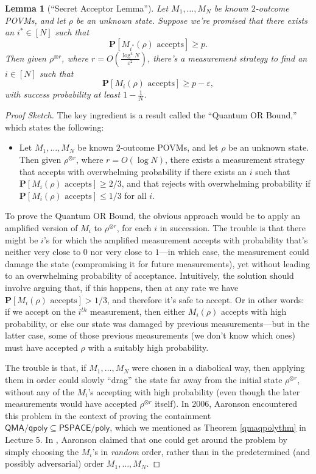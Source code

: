 \documentclass[12pt]{report}
\theoremstyle{plain}
\newtheorem{lemma}[theorem]{Lemma}
\theoremstyle{definition}
\newcommand{\eps}{\varepsilon}
\renewcommand{\Pr}{\mathbf{P}}
\begin{document}
\begin{lemma}[``Secret Acceptor Lemma'']
\label{secretacc}
Let $M_1,\ldots,M_N$ be known $2$-outcome POVMs, and let $\rho$ be an unknown state.  Suppose we're promised that there exists an $i^{*} \in [N]$ such that
$$\Pr[M_{i^{*}}(\rho)\text{ accepts}] \ge p.$$
Then given $\rho^{\otimes r}$, where $r=O\left( \frac{\log^4 N}{\eps^2} \right)$, there's a measurement strategy to find an $i \in [N]$ such that
$$\Pr[M_{i}(\rho)\text{ accepts}] \ge p - \eps,$$
with success probability at least $1-\frac{1}{N}$.
\end{lemma}
\begin{proof}[Proof Sketch]
The key ingredient is a result called the ``Quantum OR Bound,'' which states the following:
\begin{itemize}
\item Let $M_1,\ldots,M_N$ be known $2$-outcome POVMs, and let $\rho$ be an unknown state.  Then given $\rho^{\otimes r}$, where $r=O(\log N)$, there exists a measurement strategy that accepts with overwhelming probability if there exists an $i$ such that $\Pr[M_{i}(\rho)\text{ accepts}] \ge 2/3$, and that rejects with overwhelming probability if $\Pr[M_{i}(\rho)\text{ accepts}] \le 1/3$ for all $i$.
\end{itemize}
To prove the Quantum OR Bound, the obvious approach would be to apply an amplified version of $M_i$ to $\rho^{\otimes r}$, for each $i$ in succession.  The trouble is that there might be $i$'s for which the amplified measurement accepts with probability that's neither very close to $0$ nor very close to $1$---in which case, the measurement could damage the state (compromising it for future measurements), yet without leading to an overwhelming probability of acceptance.  Intuitively, the solution should involve arguing that, if this happens, then at any rate we have $\Pr[M_{i}(\rho)\text{ accepts}] > 1/3$, and therefore it's safe to accept.  Or in other words: if we accept on the $i^{th}$ measurement, then either $M_i(\rho)$ accepts with high probability, or else our state was damaged by previous measurements---but in the latter case, some of those previous measurements (we don't know which ones) must have accepted $\rho$ with a suitably high probability.

The trouble is that, if $M_1,\ldots,M_N$ were chosen in a diabolical way, then applying them in order could slowly ``drag'' the state far away from the initial state $\rho^{\otimes r}$, without any of the $M_i$'s accepting with high probability (even though the later measurements would have accepted $\rho^{\otimes r}$ itself).  In 2006, Aaronson \cite{aar:qmaqpoly} encountered this problem in the context of proving the containment $\mathsf{QMA/qpoly} \subseteq \mathsf{PSPACE/poly}$, which we mentioned as Theorem \ref{qmaqpolythm} in Lecture 5.  In \cite{aar:qmaqpoly}, Aaronson claimed that one could get around the problem by simply choosing the $M_i$'s in {\em random} order, rather than in the predetermined (and possibly adversarial) order $M_1,\ldots,M_N$.


\end{proof}
\end{document}
